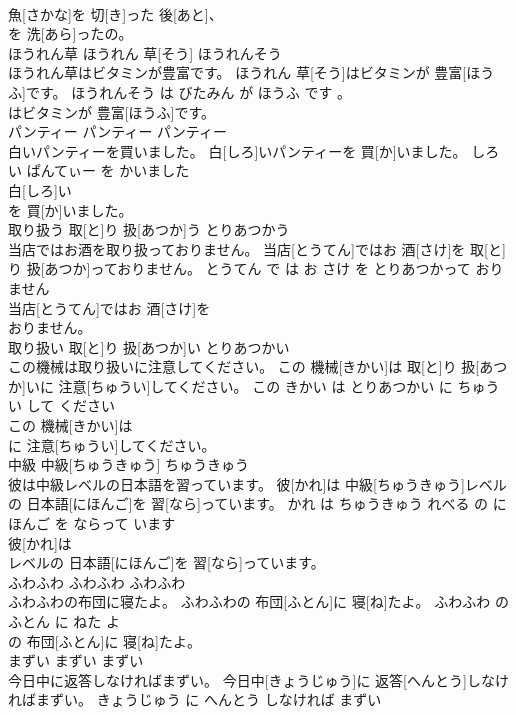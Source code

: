 \documentclass[8pt]{extreport}
\begin{document}
\begin{CJK}{UTF8}{min}
\\	魚[さかな]を 切[き]った 後[あと]、
\\	を 洗[あら]ったの。			
\\	ほうれん草	ほうれん 草[そう]	ほうれんそう	
\\	ほうれん草はビタミンが豊富です。	ほうれん 草[そう]はビタミンが 豊富[ほうふ]です。	ほうれんそう は びたみん が ほうふ です 。	
\\	はビタミンが 豊富[ほうふ]です。			
\\	パンティー	パンティー	パンティー	
\\	白いパンティーを買いました。	白[しろ]いパンティーを 買[か]いました。	しろい ぱんてぃー を かいました	
\\	白[しろ]い
\\	を 買[か]いました。			
\\	取り扱う	取[と]り 扱[あつか]う	とりあつかう	
\\	当店ではお酒を取り扱っておりません。	当店[とうてん]ではお 酒[さけ]を 取[と]り 扱[あつか]っておりません。	とうてん で は お さけ を とりあつかって おりません	
\\	当店[とうてん]ではお 酒[さけ]を
\\	おりません。			
\\	取り扱い	取[と]り 扱[あつか]い	とりあつかい	
\\	この機械は取り扱いに注意してください。	この 機械[きかい]は 取[と]り 扱[あつか]いに 注意[ちゅうい]してください。	この きかい は とりあつかい に ちゅうい して ください	
\\	この 機械[きかい]は
\\	に 注意[ちゅうい]してください。			
\\	中級	中級[ちゅうきゅう]	ちゅうきゅう	
\\	彼は中級レベルの日本語を習っています。	彼[かれ]は 中級[ちゅうきゅう]レベルの 日本語[にほんご]を 習[なら]っています。	かれ は ちゅうきゅう れべる の にほんご を ならって います	
\\	彼[かれ]は
\\	レベルの 日本語[にほんご]を 習[なら]っています。			
\\	ふわふわ	ふわふわ	ふわふわ	
\\	ふわふわの布団に寝たよ。	ふわふわの 布団[ふとん]に 寝[ね]たよ。	ふわふわ の ふとん に ねた よ	
\\	の 布団[ふとん]に 寝[ね]たよ。			
\\	まずい	まずい	まずい	
\\	今日中に返答しなければまずい。	今日中[きょうじゅう]に 返答[へんとう]しなければまずい。	きょうじゅう に へんとう しなければ まずい	

\end{CJK}
\end{document}
